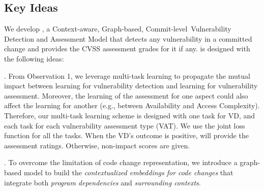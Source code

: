 \subsection{Key Ideas}
\label{key-ideas:sec}

We develop {\tool}, a Context-aware, Graph-based,
Commit-level~Vulnerability Detection and Assessment Model that detects
any vulnerability in a committed change and provides the CVSS
assessment grades for it if any.  {\tool} is designed with the
following ideas:

\vspace{1pt}
. From Observation 1, we leverage multi-task learning
to propagate the mutual impact between learning for vulnerability
detection and learning for vulnerability assessment. Moreover, the
learning of the assessment for one aspect could also affect the
learning for another (e.g., between Availability and Access
Complexity). Therefore, our multi-task learning scheme is designed
with one task for VD, and each task for each vulnerability assessment
type (VAT). We use the joint loss function for all the tasks. When the
VD's outcome is positive, {\tool} will provide the assessment
ratings. Otherwise, non-impact scores are given.


\vspace{1pt}
. To overcome
the limitation of code change representation, we introduce a
graph-based model to build the {\em
contextualized embeddings for code changes} that integrate both {\em
program dependencies} and {\em surrounding contexts}.

